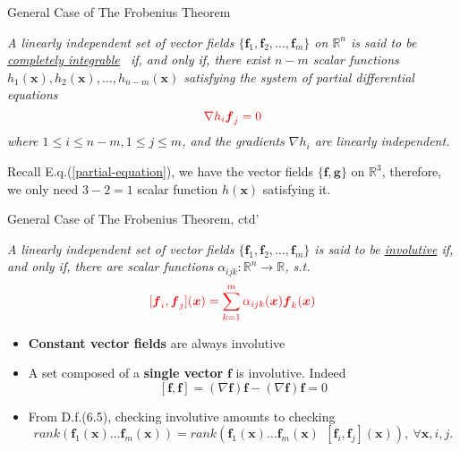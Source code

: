 \documentclass{beamer}
\renewcommand{\vec}[1]{\ensuremath{\boldsymbol{#1}}} %
\begin{document}
\begin{frame}{General Case of The Frobenius Theorem}
\begin{definition}[6.4]
\textit{A linearly independent set of vector fields $ \{ \vec{f}_{1}, \vec{f}_{2}, \dots, \vec{f}_{m} \} $ on $\mathbb{R}^{n}$ is said to be \underline{completely integrable}~ if, and only if, there exist {\color{red}$ n-m $} scalar functions $h_{1}(\vec{x}), h_{2}(\vec{x}), \dots , h_{n-m}(\vec{x})$ satisfying the system of partial differential equations
    \begin{equation}\label{differential-equation}
      {\color{red}\nabla h_{i}\vec{f}_{j} = 0}
    \end{equation}
    where $1 \leq i \leq n-m , 1 \leq j \leq m$, and the gradients $ \nabla h_{i} $ are linearly independent.}
\end{definition}

Recall E.q.(\ref{partial-equation}), we have the vector fields $\{ \vec{f}, \vec{g} \}$ on $\mathbb{R}^{3}$, therefore, we only need $3-2=1$ scalar function $h(\vec{x})$ satisfying it.
\end{frame}


\begin{frame}{General Case of The Frobenius Theorem, ctd'}
\begin{definition}[6.5]
    \textit{
    A linearly independent set of vector fields $ \{ \vec{f}_{1}, \vec{f}_{2}, \dots, \vec{f}_{m} \} $ is said to be \underline{involutive} if, and only if, there are scalar functions $\alpha_{ijk} : \mathbb{R}^{n} \rightarrow \mathbb{R} $, s.t.
    \vspace{-10pt}
        \begin{equation}\label{involutive-equation}
          {\color{red}[\vec{f}_{i}, \vec{f}_{j}](\vec{x}) = \sum_{k=1}^{m}\alpha_{ijk}(\vec{x})\vec{f}_{k}(\vec{x})}
        \end{equation}
    }
\end{definition}
\vspace{-20pt}
\begin{itemize}
  \item \textbf{Constant vector fields} are always involutive
  \item A set composed of a \textbf{single vector} \vec{f} is involutive. Indeed
  $$
  [\vec{f},\vec{f}] = (\nabla \vec{f})\vec{f} - (\nabla \vec{f})\vec{f} = 0
  $$
  \item From D.f.(6.5), checking involutive amounts to checking
  $$
  rank(\vec{f}_{1}(\vec{x}) \dots \vec{f}_{m}(\vec{x})) = rank(\vec{f}_{1}(\vec{x}) \dots \vec{f}_{m}(\vec{x}) ~~ [\vec{f}_{i}, \vec{f}_{j}](\vec{x})),~ \forall \vec{x},i,j.
  $$
\end{itemize}
\end{frame}
\end{document}

